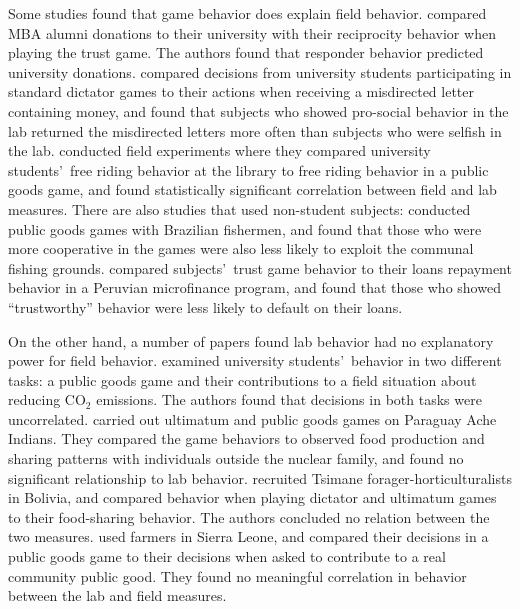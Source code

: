 \documentclass[12pt]{article}
\begin{document}
Some studies found that game behavior does explain field behavior. \cite{baran_2010} compared MBA alumni donations to their university with their reciprocity behavior when playing the trust game. The authors found that responder behavior predicted university donations. \cite{franzen_pointner_2012} compared decisions from university students participating in standard dictator games to their actions when receiving a misdirected letter containing money, and found that subjects who showed pro-social behavior in the lab returned the misdirected letters more often than subjects who were selfish in the lab. \cite{englmaier_gebhardt_2011} conducted field experiments where they compared university students\rq \ free riding behavior at the library to free riding behavior in a public goods game, and found statistically significant correlation between field and lab measures. There are also studies that used non-student subjects: \cite{fehr_leibbrandt_2011} conducted public goods games with Brazilian fishermen, and found that those who were more cooperative in the games were also less likely to exploit the communal fishing grounds. \cite{karlan_2005} compared subjects\rq \ trust game behavior to their loans repayment behavior in a Peruvian microfinance program, and found that those who showed ``trustworthy'' behavior were less likely to default on their loans. 

On the other hand, a number of papers found lab behavior had no explanatory power for field behavior. \cite{goeschl_2015} examined university students\rq \ behavior in two different tasks: a public goods game and their contributions to a field situation about reducing CO$_{2}$ emissions. The authors found that decisions in both tasks were uncorrelated. \cite{hill_gurven_2004} carried out ultimatum and public goods games on Paraguay Ache Indians. They compared the game behaviors to observed food production and sharing patterns with individuals outside the nuclear family, and found no significant relationship to lab behavior. \cite{gurven_winking_2008} recruited Tsimane forager-horticulturalists in Bolivia, and compared behavior when playing dictator and ultimatum games to their food-sharing behavior. The authors concluded no relation between the two measures. \cite{voors_2012} used farmers in Sierra Leone, and compared their decisions in a public goods game to their decisions when asked to contribute to a real community public good. They found no meaningful correlation in behavior between the lab and field measures. 
\end{document}
